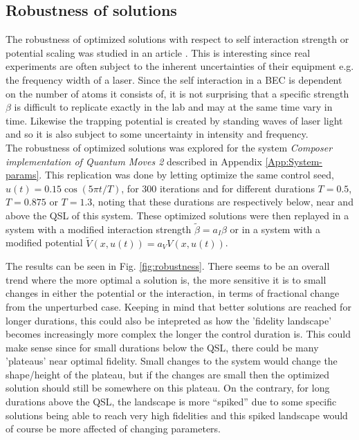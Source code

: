 \documentclass[a4paper, twocolumn]{revtex4-1}
\begin{document}
\subsection{Robustness of solutions} \label{subsec:robustness} 
The robustness of optimized solutions with respect to self interaction strength or potential scaling was studied in an article \cite{GroupPaper}. This is interesting since real experiments are often subject to the inherent uncertainties of their equipment e.g. the frequency width of a laser. Since the self interaction in a BEC is dependent on the number of atoms it consists of, it is not surprising that a specific strength $\beta$ is difficult to replicate exactly in the lab and may at the same time vary in time. Likewise the trapping potential is created by standing waves of laser light and so it is also subject to some uncertainty in intensity and frequency.  \\

The robustness of optimized solutions was explored for the system \textit{Composer implementation of Quantum Moves 2} described in Appendix \ref{App:System-params}. This replication was done by letting  optimize the same control seed, $u(t)=0.15\cos(5\pi t/T)$, for $300$ iterations and for different durations $T=0.5$, $T=0.875$ or $T=1.3$, noting that these durations are respectively below, near and above the QSL of this system. These optimized solutions were then replayed in a system with a modified interaction strength $\tilde{\beta} = a_I \beta$ or in a system with a modified potential $\tilde{V}(x,u(t)) = a_V V(x,u(t))$.

The results can be seen in Fig. \ref{fig:robustness}. There seems to be an overall trend where the more optimal a solution is, the more sensitive it is to small changes in either the potential or the interaction, in terms of fractional change from the unperturbed case. Keeping in mind that better solutions are reached for longer durations, this could also be intepreted as how the 'fidelity landscape' becomes increasingly more complex the longer the control duration is. This could make sense since for small durations below the QSL, there could be many 'plateaus' near optimal fidelity. Small changes to the system would change the shape/height of the plateau, but if the changes are small then the optimized solution should still be somewhere on this plateau. On the contrary, for long durations above the QSL, the landscape is more ``spiked'' due to some specific solutions being able to reach very high fidelities and this spiked landscape would of course be more affected of changing parameters. \\
\end{document}
